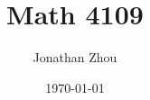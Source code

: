 \documentclass[11pt,letterpaper]{book}
\begin{document}
\theoremstyle{plain}
\newtheorem{thm}{Theorem}[section]
\theoremstyle{definition}
\newtheorem{defn}[thm]{Definiton}

\frontmatter
\title{Math 4109}
\author{Jonathan Zhou}
\date{\today}
\maketitle

\tableofcontents
\mainmatter






\appendix


\end{document}
